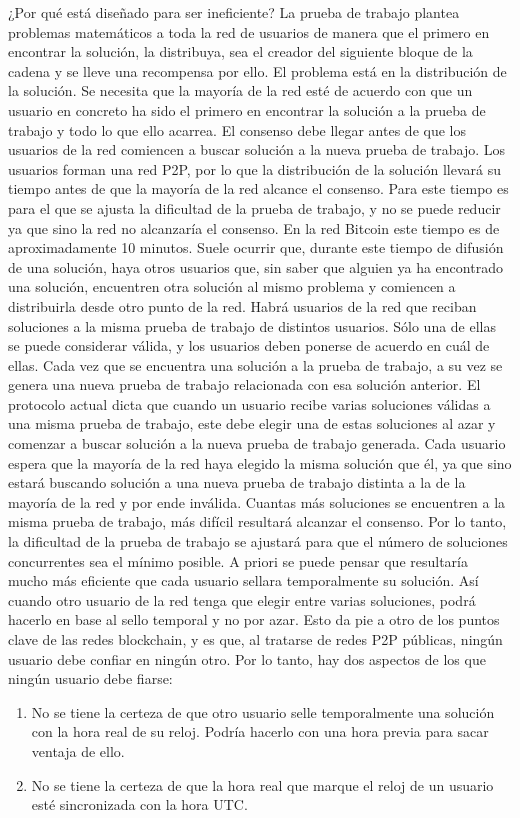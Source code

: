 ¿Por qué está diseñado para ser ineficiente? La prueba de trabajo plantea problemas matemáticos a toda la red de usuarios de manera que el primero en encontrar la solución, la distribuya, sea el creador del siguiente bloque de la cadena y se lleve una recompensa por ello. El problema está en la distribución de la solución. Se necesita que la mayoría de la red esté de acuerdo con que un usuario en concreto ha sido el primero en encontrar la solución a la prueba de trabajo y todo lo que ello acarrea. El consenso debe llegar antes de que los usuarios de la red comiencen a buscar solución a la nueva prueba de trabajo. Los usuarios forman una red P2P, por lo que la distribución de la solución llevará su tiempo antes de que la mayoría de la red alcance el consenso. Para este tiempo es para el que se ajusta la dificultad de la prueba de trabajo, y no se puede reducir ya que sino la red no alcanzaría el consenso. En la red Bitcoin este tiempo es de aproximadamente 10 minutos. Suele ocurrir que, durante este tiempo de difusión de una solución, haya otros usuarios que, sin saber que alguien ya ha encontrado una solución, encuentren otra solución al mismo problema y comiencen a distribuirla desde otro punto de la red. Habrá usuarios de la red que reciban soluciones a la misma prueba de trabajo de distintos usuarios. Sólo una de ellas se puede considerar válida, y los usuarios deben ponerse de acuerdo en cuál de ellas. Cada vez que se encuentra una solución a la prueba de trabajo, a su vez se genera una nueva prueba de trabajo relacionada con esa solución anterior. El protocolo actual dicta que cuando un usuario recibe varias soluciones válidas a una misma prueba de trabajo, este debe elegir una de estas soluciones al azar y comenzar a buscar solución a la nueva prueba de trabajo generada. Cada usuario espera que la mayoría de la red haya elegido la misma solución que él, ya que sino estará buscando solución a una nueva prueba de trabajo distinta a la de la mayoría de la red y por ende inválida. Cuantas más soluciones se encuentren a la misma prueba de trabajo, más difícil resultará alcanzar el consenso. Por lo tanto, la dificultad de la prueba de trabajo se ajustará para que el número de soluciones concurrentes sea el mínimo posible.
A priori se puede pensar que resultaría mucho más eficiente que cada usuario sellara temporalmente su solución. Así cuando otro usuario de la red tenga que elegir entre varias soluciones, podrá hacerlo en base al sello temporal y no por azar. Esto da pie a otro de los puntos clave de las redes blockchain, y es que, al tratarse de redes P2P públicas, ningún usuario debe confiar en ningún otro. Por lo tanto, hay dos aspectos de los que ningún usuario debe fiarse:
\begin{enumerate}
	\item No se tiene la certeza de que otro usuario selle temporalmente una solución con la hora real de su reloj. Podría hacerlo con una hora previa para sacar ventaja de ello.
	\item No se tiene la certeza de que la hora real que marque el reloj de un usuario esté sincronizada con la hora UTC.
\end{enumerate}
	
